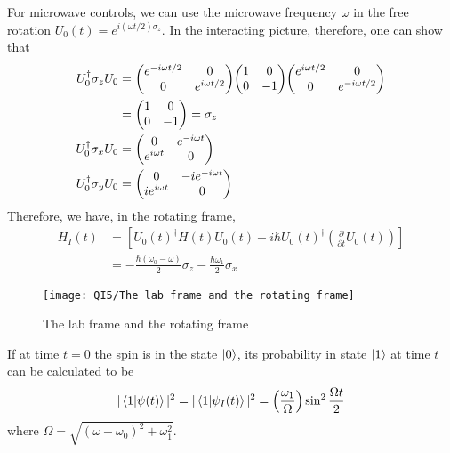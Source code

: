 For microwave controls, we can use the microwave frequency $\omega$ in the free rotation $U_0(t)=e^{i(\omega t/2)\sigma_z}$. In the interacting picture, therefore, one can show that
\begin{align*}
    U_0^\dagger \sigma_z U_0&=\begin{pmatrix}
        e^{-i\omega t/2} & 0\\0& e^{i\omega t/2}
    \end{pmatrix}\hspace*{-2pt} \begin{pmatrix}
        1 & 0 \\ 0 &-1
    \end{pmatrix}\hspace*{-2pt} \begin{pmatrix}
        e^{i\omega t/2} & 0\\0& e^{-i\omega t/2}
    \end{pmatrix}\\
    &=\begin{pmatrix}
        1 & 0 \\ 0 & -1 
    \end{pmatrix}=\sigma_z\\
    U_0^\dagger \sigma_x U_0&=\begin{pmatrix}
        0 & e^{-i\omega t}\\e^{i\omega t}&0
    \end{pmatrix}\\
    U_0^\dagger \sigma_y U_0&=\begin{pmatrix}
        0 & -ie^{-i\omega t}\\ie^{i\omega t}&0
    \end{pmatrix}
\end{align*}
Therefore, we have, in the rotating frame,
\begin{align*}
    H_I(t)&=\left[ U_0(t)^\dagger H(t) U_0(t)-i\hbar U_0(t)^\dagger\left( \frac{\partial}{\partial t}U_0(t) \right) \right]\\
    &=-\frac{\hbar(\omega_0-\omega)}{2}\sigma_z-\frac{\hbar\omega_1}{2}\sigma_x
\end{align*}
\begin{figure}[H]
    \centering
    \texttt{[image: QI5/The lab frame and the rotating frame]}
    \caption{The lab frame and the rotating frame}
\end{figure}


If at time $t=0$ the spin is in the state $\ket{0}$, its probability in state $\ket{1}$ at time $t$ can be calculated to be 
\begin{align*}
    |\braket{1|\psi(t)}|^2=|\braket{1|\psi_I(t)}|^2=\left( \frac{\omega_1}{\Omega} \right)\sin^2\frac{\Omega t}{2}
\end{align*}
where $\Omega=\sqrt{(\omega-\omega_0)^2+\omega_1^2}$.

